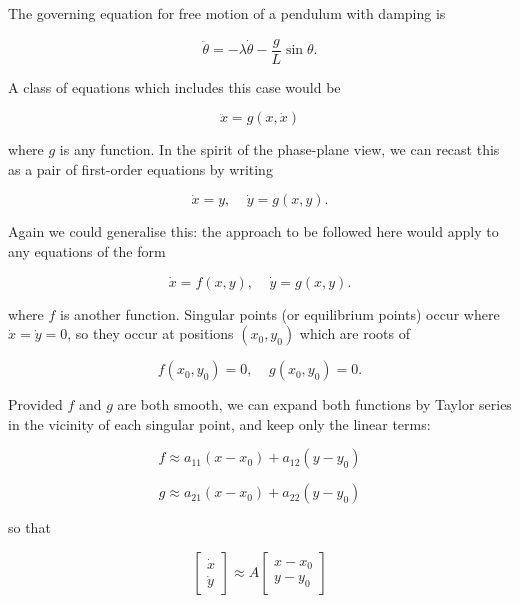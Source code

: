   The governing equation for free motion of a pendulum with damping is 

  \begin{equation*}\ddot{\theta} = -\lambda \dot{\theta} -\dfrac{g}{L} \sin 
  \theta . \tag{1}\end{equation*} 

  A class of equations which includes this case would be 

  \begin{equation*}\ddot{x}=g(x,\dot{x}) \tag{2}\end{equation*} 

  \noindent{}where $g$ is any function. In the spirit of the phase-plane view, 
  we can recast this as a pair of first-order equations by writing 

  \begin{equation*}\dot{x} = y,\mathrm{~~~~~}\dot{y}=g(x,y). 
  \tag{3}\end{equation*} 

  Again we could generalise this: the approach to be followed here would apply 
  to any equations of the form 

  \begin{equation*}\dot{x} = f(x,y),\mathrm{~~~~~}\dot{y}=g(x,y). 
  \tag{4}\end{equation*} 

  \noindent{}where $f$ is another function. Singular points (or equilibrium 
  points) occur where $\dot{x}=\dot{y}=0$, so they occur at positions 
  $(x_0,y_0)$ which are roots of 

  \begin{equation*}f(x_0,y_0)=0, \mathrm{~~~~~}g(x_0,y_0)=0. 
  \tag{5}\end{equation*} 

  Provided $f$ and $g$ are both smooth, we can expand both functions by Taylor 
  series in the vicinity of each singular point, and keep only the linear 
  terms: 

  \begin{equation*}f \approx a_{11} (x-x_0) + a_{12} (y-y_0)\end{equation*} 

  \begin{equation*}g \approx a_{21} (x-x_0) + a_{22} (y-y_0) 
  \tag{6}\end{equation*} 

  \noindent{}so that 

  \begin{equation*}\begin{bmatrix}\dot{x}\\ \dot{y}\end{bmatrix} \approx A 
  \begin{bmatrix}x-x_0\\ y-y_0\end{bmatrix} \tag{7}\end{equation*} 

